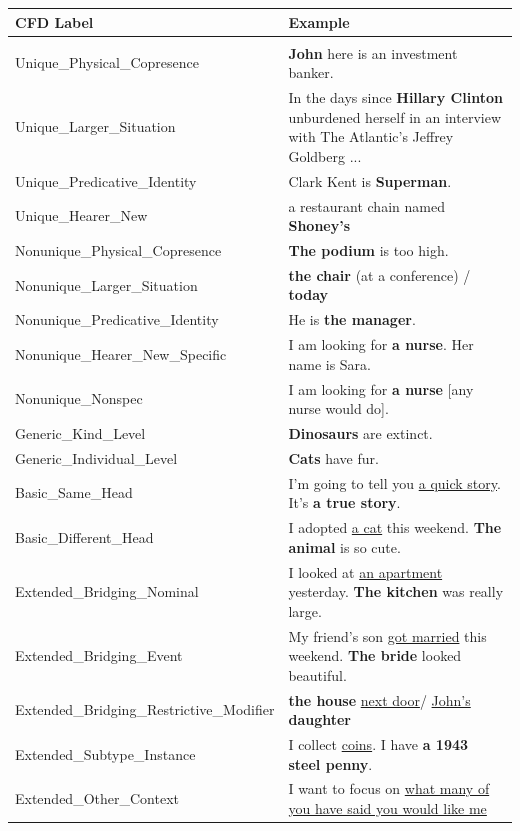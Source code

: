\documentclass[landscape,final]{baposter}
\begin{document}
\begin{poster}
{\vspace{4pt}
\begin {center}\small
\smaller[.5]
\begin{tabular}{p{18em}p{32em}}
{\bf \normalsize{CFD Label}}&{\bf \normalsize{Example}}\\\hline\\Unique\_Physical\_Copresence & {\bf John} here is an investment banker.\\Unique\_Larger\_Situation & In the days since {\bf Hillary Clinton} unburdened herself in an interview with The Atlantic's Jeffrey Goldberg ...\\Unique\_Predicative\_Identity & Clark Kent is {\bf Superman}.\\Unique\_Hearer\_New & a restaurant chain named {\bf Shoney's}\\Nonunique\_Physical\_Copresence & {\bf The podium} is too high.\\Nonunique\_Larger\_Situation & {\bf the chair} (at a conference) / {\bf today}\\Nonunique\_Predicative\_Identity & He is {\bf the manager}.\\Nonunique\_Hearer\_New\_Specific & I am looking for {\bf a nurse}. Her name is Sara.\\Nonunique\_Nonspec & I am looking for {\bf a nurse} [any nurse would do].\\Generic\_Kind\_Level & {\bf Dinosaurs} are extinct.\\Generic\_Individual\_Level & {\bf Cats} have fur.\\Basic\_Same\_Head & I'm going to tell you \underline{a quick story}. It's {\bf a true story}.\\Basic\_Different\_Head & I adopted \underline{a cat} this weekend. {\bf The animal} is so cute.\\Extended\_Bridging\_Nominal & I looked at \underline{an apartment} yesterday. {\bf The kitchen} was really large.\\Extended\_Bridging\_Event & My friend's son \underline{got married} this weekend. {\bf The bride} looked beautiful.\\Extended\_Bridging\_Restrictive\_Modifier & {\bf the house} \underline{next door}/ \underline{John's} {\bf daughter}\\Extended\_Subtype\_Instance & I collect \underline{coins}. I have {\bf a 1943 steel penny}.\\Extended\_Other\_Context & I want to focus on \underline{what many of you have said you would like me}\\

\end{tabular}
\end{center}}
\end{poster}
\end{document}
